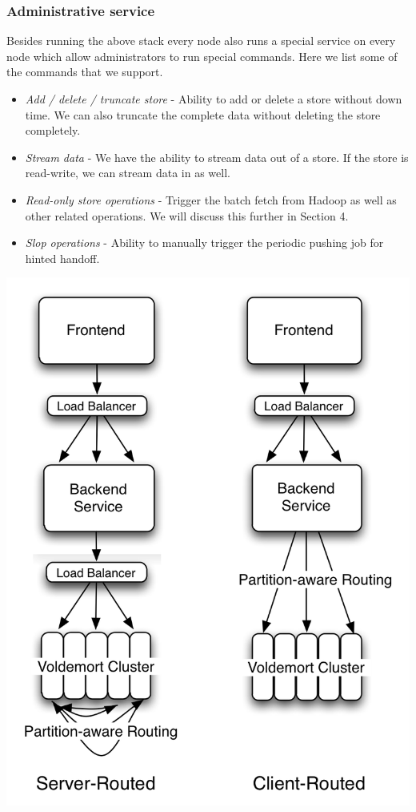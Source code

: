 \documentclass[10pt,twocolumn,preprint,natbib,authoryear]{sigplanconf}
\begin{document}
\subsubsection{Administrative service}
Besides running the above stack every node also runs a special service on every node which allow administrators to run special commands. Here we list some of the commands that we support.

\begin{itemize}
	
	\item \emph{Add / delete / truncate store} - Ability to add or delete a store without down time. We can also truncate the complete data without deleting the store completely. 
	\item \emph{Stream data} - We have the ability to stream data out of a store. If the store is read-write, we can stream data in as well. 
	\item \emph{Read-only store operations } - Trigger the batch fetch from Hadoop as well as other related operations. We will discuss this further in Section 4. 
	\item \emph{Slop operations } - Ability to manually trigger the periodic pushing job for hinted handoff. 
	
\end{itemize}

\begin{center}
\includegraphics[scale=0.60]{fullstack.png}
\end{center}
	
\end{document}
